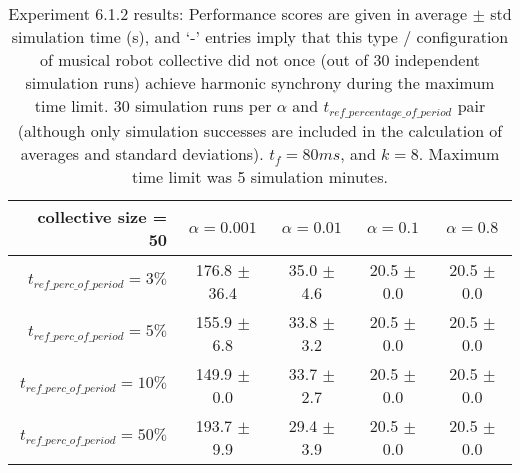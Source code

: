 \begin{table}[t]
	\begin{minipage}{\textwidth}
		\centering
		\begin{tabular}{r | c c c c} \toprule
			collective size = 50
			  & {$\alpha = 0.001$} & {$\alpha = 0.01$} & {$\alpha = 0.1$} & {$\alpha = 0.8$} \\\hline
			{$t_{ref\_perc\_of\_period} = 3\%$} & 176.8 $\pm$ 36.4 & 35.0 $\pm$ 4.6 & 20.5 $\pm$ 0.0 & 20.5 $\pm$ 0.0 \\
			{$t_{ref\_perc\_of\_period} = 5\%$} & 155.9 $\pm$ 6.8 & 33.8 $\pm$ 3.2 & 20.5 $\pm$ 0.0 & 20.5 $\pm$ 0.0 \\
			{$t_{ref\_perc\_of\_period} = 10\%$} & 149.9 $\pm$ 0.0 & 33.7 $\pm$ 2.7 & 20.5 $\pm$ 0.0 & 20.5 $\pm$ 0.0 \\
			{$t_{ref\_perc\_of\_period} = 50\%$} & 193.7 $\pm$ 9.9 & 29.4 $\pm$ 3.9 & 20.5 $\pm$ 0.0 & 20.5 $\pm$ 0.0
		\end{tabular}
	\end{minipage}
\caption*{Experiment 6.1.2 results: Performance scores are given in average $\pm$ std simulation time (s), and `-' entries imply that this type / configuration of musical robot collective did not once (out of 30 independent simulation runs) achieve harmonic synchrony during the maximum time limit. 30 simulation runs per $\alpha$ and $t_{ref\_percentage\_of\_period}$ pair (although only simulation successes are included in the calculation of averages and standard deviations). $t_f=80ms$, and $k=8$. Maximum time limit was 5 simulation minutes.}
\end{table}